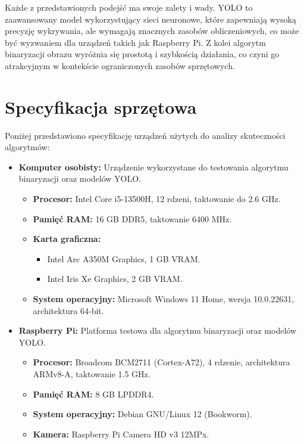 \documentclass[a4paper,twoside,12pt]{book}
\begin{document}
Każde z przedstawionych podejść ma swoje zalety i wady. YOLO to zaawansowany model wykorzystujący sieci neuronowe, które zapewniają wysoką precyzję wykrywania, ale wymagają znacznych zasobów obliczeniowych, co może być wyzwaniem dla urządzeń takich jak Raspberry Pi. Z kolei algorytm binaryzacji obrazu wyróżnia się prostotą i szybkością działania, co czyni go atrakcyjnym w kontekście ograniczonych zasobów sprzętowych.
\newpage

\section{Specyfikacja sprzętowa}
Poniżej przedstawiono specyfikację urządzeń użytych do analizy skuteczności algorytmów:
\begin{itemize}
    \item \textbf{Komputer osobisty:} Urządzenie wykorzystane do testowania algorytmu binaryzacji oraz modelów YOLO.
    \begin{itemize}
        \item \textbf{Procesor:} Intel Core i5-13500H, 12 rdzeni, taktowanie do 2.6 GHz.
        \item \textbf{Pamięć RAM:} 16 GB DDR5, taktowanie 6400 MHz.
        \item \textbf{Karta graficzna:} 
        \begin{itemize}
            \item Intel Arc A350M Graphics, 1 GB VRAM.
            \item Intel Iris Xe Graphics, 2 GB VRAM.
        \end{itemize}
        \item \textbf{System operacyjny:} Microsoft Windows 11 Home, wersja 10.0.22631, architektura 64-bit.
    \end{itemize}
    \item \textbf{Raspberry Pi:} Platforma testowa dla algorytmu binaryzacji oraz modelów YOLO.
    \begin{itemize}
        \item \textbf{Procesor:} Broadcom BCM2711 (Cortex-A72), 4 rdzenie, architektura ARMv8-A, taktowanie 1.5 GHz.
        \item \textbf{Pamięć RAM:} 8 GB LPDDR4.
        \item \textbf{System operacyjny:} Debian GNU/Linux 12 (Bookworm).
        \item \textbf{Kamera:} Raspberry Pi Camera HD v3 12MPx.
    \end{itemize}    
\end{itemize}
\end{document}
